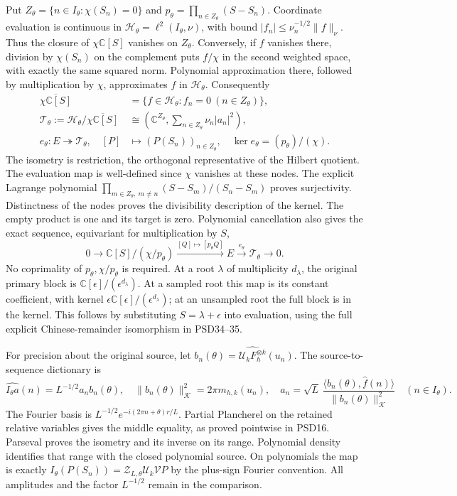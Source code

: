 \documentclass{article}
\begin{document}
Put \(Z_\theta=\{n\in I_\theta:\chi(S_n)=0\}\) and
\(p_\theta=\prod_{n\in Z_\theta}(S-S_n)\). Coordinate evaluation
is continuous in \(\mathcal H_\theta=\ell^2(I_\theta,\nu)\),
with bound \(|f_n|\le\nu_n^{-1/2}\|f\|_\nu\).
Thus the closure of \(\chi\mathbb C[S]\) vanishes on \(Z_\theta\).
Conversely, if \(f\) vanishes there, division by \(\chi(S_n)\)
on the complement puts \(f/\chi\) in the second weighted space,
with exactly the same squared norm. Polynomial approximation
there, followed by multiplication by \(\chi\), approximates
\(f\) in \(\mathcal H_\theta\). Consequently
\[
 \begin{split}
 \overline{\chi\mathbb C[S]}
 &=\{f\in\mathcal H_\theta:f_n=0\ (n\in Z_\theta)\},\\
 \mathcal T_\theta:=
 \mathcal H_\theta/\overline{\chi\mathbb C[S]}
 &\cong\left(\mathbb C^{Z_\theta},
          \sum_{n\in Z_\theta}\nu_n|a_n|^2\right),\\
 e_\theta:E\twoheadrightarrow\mathcal T_\theta,\quad
 [P]&\longmapsto(P(S_n))_{n\in Z_\theta},\quad
 \ker e_\theta=(p_\theta)/(\chi).
 \end{split}
 \tag{HDI17}
\]
The isometry is restriction, the orthogonal representative of
the Hilbert quotient. The evaluation map is well-defined since
\(\chi\) vanishes at these nodes. The explicit Lagrange polynomial
\(\prod_{m\in Z_\theta,\ m\ne n}(S-S_m)/(S_n-S_m)\)
proves surjectivity. Distinctness of the nodes proves the
divisibility description of the kernel. The empty product is
one and its target is zero. Polynomial cancellation also gives
the exact sequence, equivariant for multiplication by \(S\),
\[
 0\longrightarrow\mathbb C[S]/(\chi/p_\theta)
 \xrightarrow{[Q]\mapsto[p_\theta Q]}E
 \xrightarrow{e_\theta}\mathcal T_\theta\longrightarrow0.
 \tag{HDI18}
\]
No coprimality of \(p_\theta,\chi/p_\theta\) is required.
At a root \(\lambda\) of multiplicity \(d_\lambda\), the original
primary block is \(\mathbb C[\epsilon]/(\epsilon^{d_\lambda})\).
At a sampled root this map is its constant coefficient, with
kernel \(\epsilon\mathbb C[\epsilon]/(\epsilon^{d_\lambda})\);
at an unsampled root the full block is in the kernel. This
follows by substituting \(S=\lambda+\epsilon\) into evaluation,
using the full explicit Chinese-remainder isomorphism in
PSD34--35.

For precision about the original source, let
\(b_n(\theta)=\widehat{\mathcal U_kF_h^{\otimes k}}(u_n)\).
The source-to-sequence dictionary is
\[
 \widehat{I_\theta a}(n)=L^{-1/2}a_nb_n(\theta),\quad
 \|b_n(\theta)\|_{\mathcal K}^2=2\pi m_{h,k}(u_n),\quad
 a_n=\sqrt L\,\frac{\langle b_n(\theta),\widehat f(n)\rangle}
                         {\|b_n(\theta)\|_{\mathcal K}^2}
 \quad(n\in I_\theta).
 \tag{HDI19}
\]
The Fourier basis is
\(L^{-1/2}e^{-i(2\pi n+\theta)r/L}\). Partial Plancherel on the
retained relative variables gives the middle equality, as
proved pointwise in PSD16. Parseval proves the isometry and its
inverse on its range. Polynomial density identifies that range
with the closed polynomial source. On polynomials the map is
exactly
\(I_\theta(P(S_n))=\mathcal Z_{L,\theta}\mathcal U_k\mathcal VP\)
by the plus-sign Fourier convention. All amplitudes and the
factor \(L^{-1/2}\) remain in the comparison.
\end{document}
